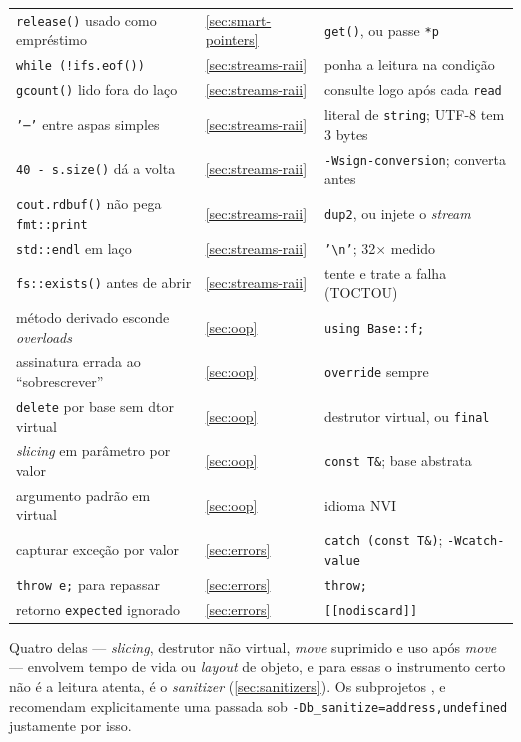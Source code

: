 \begin{table}[htbp]
\begin{tabular}{@{}p{}p{}p{}@{}}
\texttt{release()} usado como empréstimo   & \ref{sec:smart-pointers}
    & \texttt{get()}, ou passe \texttt{*p} \\
\texttt{while (!ifs.eof())}                & \ref{sec:streams-raii}
    & ponha a leitura na condição \\
\texttt{gcount()} lido fora do laço        & \ref{sec:streams-raii}
    & consulte logo após cada \texttt{read} \\
\texttt{'─'} entre aspas simples           & \ref{sec:streams-raii}
    & literal de \texttt{string}; UTF-8 tem 3 bytes \\
\texttt{40 - s.size()} dá a volta          & \ref{sec:streams-raii}
    & \texttt{-Wsign-conversion}; converta antes \\
\texttt{cout.rdbuf()} não pega \texttt{fmt::print} & \ref{sec:streams-raii}
    & \texttt{dup2}, ou injete o \emph{stream} \\
\texttt{std::endl} em laço                 & \ref{sec:streams-raii}
    & \texttt{'\textbackslash n'}; 32$\times$ medido \\
\texttt{fs::exists()} antes de abrir       & \ref{sec:streams-raii}
    & tente e trate a falha (TOCTOU) \\
método derivado esconde \emph{overloads}   & \ref{sec:oop}
    & \texttt{using Base::f;} \\
assinatura errada ao ``sobrescrever''      & \ref{sec:oop}
    & \texttt{override} sempre \\
\texttt{delete} por base sem dtor virtual  & \ref{sec:oop}
    & destrutor virtual, ou \texttt{final} \\
\emph{slicing} em parâmetro por valor      & \ref{sec:oop}
    & \texttt{const T\&}; base abstrata \\
argumento padrão em virtual                & \ref{sec:oop}
    & idioma NVI \\
capturar exceção por valor                 & \ref{sec:errors}
    & \texttt{catch (const T\&)}; \texttt{-Wcatch-value} \\
\texttt{throw e;} para repassar            & \ref{sec:errors}
    & \texttt{throw;} \\
retorno \texttt{expected} ignorado         & \ref{sec:errors}
    & \texttt{[[nodiscard]]} \\
\bottomrule
\end{tabular}
\end{table}

Quatro delas --- \emph{slicing}, destrutor não virtual, \emph{move} suprimido e
uso após \emph{move} --- envolvem tempo de vida ou \emph{layout} de objeto, e
para essas o instrumento certo não é a leitura atenta, é o \emph{sanitizer}
(\cref{sec:sanitizers}). Os subprojetos ,
 e  recomendam explicitamente uma passada sob
\texttt{-Db\_sanitize=address,undefined} justamente por isso.
